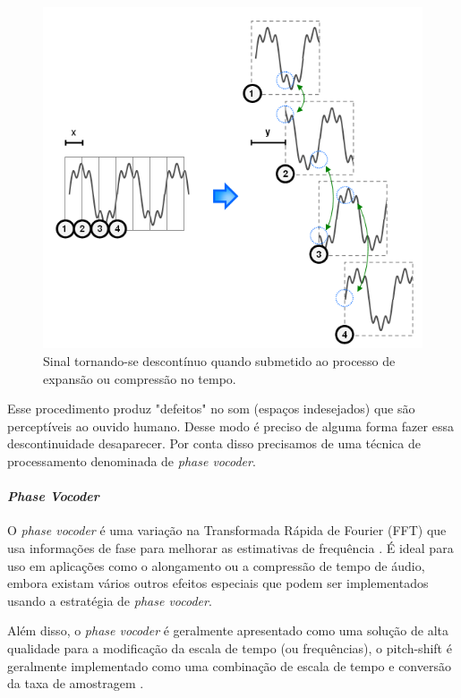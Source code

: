 				\begin{figure}[!ht]
					\centering
					\includegraphics[scale=0.5]{./figuras/pitch-descont.PNG}
					\caption{Sinal tornando-se descontínuo quando submetido ao processo de expansão ou compressão no tempo.}
					\label{fig-pitch-shifter-exem03}
				\end{figure} 
				
				Esse procedimento produz "defeitos" no som (espaços indesejados) que são perceptíveis ao ouvido humano. Desse modo é preciso de alguma forma fazer essa descontinuidade desaparecer. Por conta disso precisamos de uma técnica de processamento denominada de \textit{phase vocoder}.
				
			\paragraph{\textit{Phase Vocoder}}
				\label{parafrafo-phase-vocoder}
				
				O \textit{phase vocoder} é uma variação na Transformada Rápida de Fourier (FFT) que usa informações de fase para melhorar as estimativas de frequência \cite{Sethares}. É ideal para uso em aplicações como o alongamento  ou a compressão de tempo de áudio, embora existam vários outros efeitos especiais que podem ser implementados usando a estratégia de \textit{phase vocoder}.
				
				Além disso, o \textit{phase vocoder} é geralmente apresentado como uma solução de alta qualidade para a modificação da escala de tempo (ou frequências), o pitch-shift é geralmente implementado como uma combinação de escala de tempo e conversão da taxa de amostragem \cite{Laroche1999}.
				
